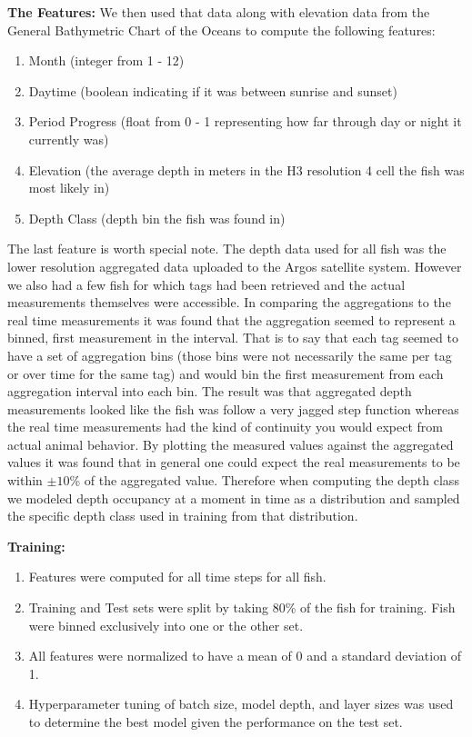 \documentclass[11pt]{article}
\begin{document}
\textbf{The Features:} We then used that data along with elevation data from the General Bathymetric Chart of the Oceans to compute the following features:

\begin{enumerate}
\item Month (integer from 1 - 12)
\item Daytime (boolean indicating if it was between sunrise and sunset)
\item Period Progress (float from 0 - 1 representing how far through day or night it currently was)
\item Elevation (the average depth in meters in the H3 resolution 4 cell the fish was most likely in) 
\item Depth Class (depth bin the fish was found in)
\end{enumerate}

The last feature is worth special note. The depth data used for all fish was the lower resolution aggregated data uploaded to the Argos satellite system. However we also had a few fish for which tags had been retrieved and the actual measurements themselves were accessible. In comparing the aggregations to the real time measurements it was found that the aggregation seemed to represent a binned, first measurement in the interval. That is to say that each tag seemed to have a set of aggregation bins (those bins were not necessarily the same per tag or over time for the same tag) and would bin the first measurement from each aggregation interval into each bin. The result was that aggregated depth measurements looked like the fish was follow a very jagged step function whereas the real time measurements had the kind of continuity you would expect from actual animal behavior. By plotting the measured values against the aggregated values it was found that in general one could expect the real measurements to be within $\pm10$\% of the aggregated value. Therefore when computing the depth class we modeled depth occupancy at a moment in time as a distribution and sampled the specific depth class used in training from that distribution. \newline

\textbf{Training:}

\begin{enumerate}
\item Features were computed for all time steps for all fish.
\item Training and Test sets were split by taking 80\% of the fish for training. Fish were binned exclusively into one or the other set. 
\item All features were normalized to have a mean of 0 and a standard deviation of 1. 
\item Hyperparameter tuning of batch size, model depth, and layer sizes was used to determine the best model given the performance on the test set. 
\end{enumerate}
\end{document}
